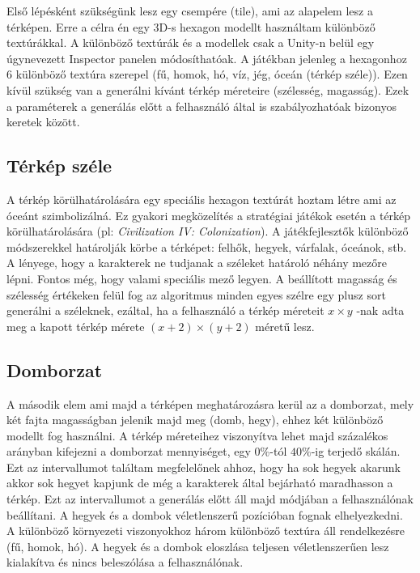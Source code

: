 \noindent Első lépésként szükségünk lesz egy csempére (tile), ami az alapelem lesz a térképen. Erre a célra én egy 3D-s hexagon modellt használtam különböző textúrákkal. A különböző textúrák és a modellek csak a Unity-n belül egy úgynevezett Inspector panelen módosíthatóak. A játékban jelenleg a hexagonhoz 6 különböző textúra szerepel (fű, homok, hó, víz, jég, óceán (térkép széle)).
\newline
\newline Ezen kívül szükség van a generálni kívánt térkép méreteire (szélesség, magasság). Ezek a paraméterek a generálás előtt a felhasználó által is szabályozhatóak bizonyos keretek között.

\subsection{Térkép széle}

A térkép körülhatárolására egy speciális hexagon textúrát hoztam létre ami az óceánt szimbolizálná. Ez gyakori megközelítés a stratégiai játékok esetén a térkép körülhatárolására (pl: \textit{Civilization IV: Colonization}). A játékfejlesztők különböző módszerekkel határolják körbe a térképet: felhők, hegyek, várfalak, óceánok, stb. A lényege, hogy a karakterek ne tudjanak a széleket határoló néhány mezőre lépni. Fontos még, hogy valami speciális mező legyen.
\newline
\newline A beállított magasság és szélesség értékeken felül fog az algoritmus minden egyes szélre egy plusz sort generálni a széleknek, ezáltal, ha a felhasználó a térkép méreteit $x \times y$ -nak adta meg a kapott térkép mérete $(x+2) \times (y+2)$ méretű lesz.

\subsection{Domborzat}

A második elem ami majd a térképen meghatározásra kerül az a domborzat, mely két fajta magasságban jelenik majd meg (domb, hegy), ehhez két különböző modellt fog használni. A térkép méreteihez viszonyítva lehet majd százalékos arányban kifejezni a domborzat mennyiséget, egy $0\%$-tól $40\%$-ig terjedő skálán. Ezt az intervallumot találtam megfelelőnek ahhoz, hogy ha sok hegyek akarunk akkor sok hegyet kapjunk de még a karakterek által bejárható maradhasson a térkép. Ezt az intervallumot a generálás előtt áll majd módjában a felhasználónak beállítani. A hegyek és a dombok véletlenszerű pozícióban fognak elhelyezkedni. A különböző környezeti viszonyokhoz három különböző textúra áll rendelkezésre (fű, homok, hó). A hegyek és a dombok eloszlása teljesen véletlenszerűen lesz kialakítva és nincs beleszólása a felhasználónak.

